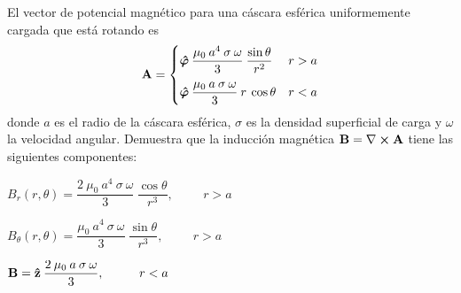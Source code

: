 \documentclass[12pt]{article}
\begin{document}
\begin{milista}
\item El vector de potencial magnético para una cáscara esférica uniformemente cargada que está rotando es
\begin{align*}
\vb{A} = \begin{cases}
\vu*{\varphi} \: \dfrac{\mu_{0} \: a^{4} \: \sigma \: \omega}{3} \: \dfrac{\sin \theta}{r^{2}} & r > a \\[1em]
\vu*{\varphi} \: \dfrac{\mu_{0} \: a \: \sigma \: \omega}{3} \: r \: \cos \theta & r < a
\end{cases}
\end{align*}
donde $a$ es el radio de la cáscara esférica, $\sigma$ es la densidad superficial de carga y $\omega$ la velocidad angular. Demuestra que la inducción magnética $\vb{B} = \vb{\nabla} \cp \vb{A}$ tiene las siguientes componentes:
\begin{milista}\itemsep4pt
\item $B_{r} (r, \theta) = \dfrac{2 \: \mu_{0} \: a^{4} \: \sigma \: \omega}{3} \: \dfrac{\cos \theta}{r^{3}}, \hspace{1cm} r>a$
\item $B_{\theta} (r, \theta) = \dfrac{\mu_{0} \: a^{4} \: \sigma \: \omega}{3} \: \dfrac{\sin \theta}{r^{3}}, \hspace{1cm} r>a$
\item $\vb{B} = \vu{z} \: \dfrac{2 \: \mu_{0} \: a \: \sigma \: \omega}{3}, \hspace{1cm} r < a$
\end{milista}
\end{milista}
\end{document}
